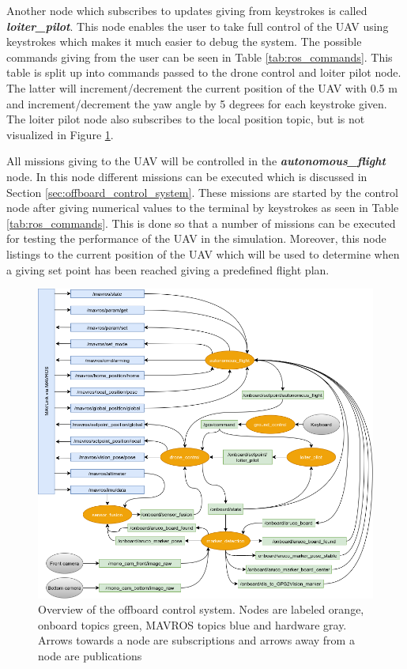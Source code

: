 \documentclass[../Head/report.tex]{subfiles}
\begin{document}
Another node which subscribes to updates giving from keystrokes is called  \textit{\textbf{loiter\_pilot}}. This node enables the user to take full control of the UAV using keystrokes which makes it much easier to debug the system. The possible commands giving from the user can be seen in Table \ref{tab:ros_commands}. This table is split up into commands passed to the drone control and loiter pilot node. The latter will increment/decrement the current position of the UAV with 0.5 m and increment/decrement the yaw angle by 5 degrees for each keystroke given. The loiter pilot node also subscribes to the local position topic, but is not visualized in Figure \ref{fig:offboard_control}.

All missions giving to the UAV will be controlled in the \textit{\textbf{autonomous\_flight}} node. In this node different missions can be executed which is discussed in Section \ref{sec:offboard_control_system}. These missions are started by the control node after giving numerical values to the terminal by keystrokes as seen in Table  \ref{tab:ros_commands}. This is done so that a number of missions can be executed for testing the performance of the UAV in the simulation. Moreover, this node listings to the current position of the UAV which will be used to determine when a giving set point has been reached giving a predefined flight plan. 

\begin{figure}[H]
    \centering
    \includegraphics[width=0.95\linewidth]{../Figures/node_communication.png}
    \caption{Overview of the offboard control system. Nodes are labeled orange, onboard topics green, MAVROS topics blue and hardware gray. Arrows towards a node are subscriptions and arrows away from a node are publications}
    \label{fig:offboard_control}
\end{figure}
\end{document}

